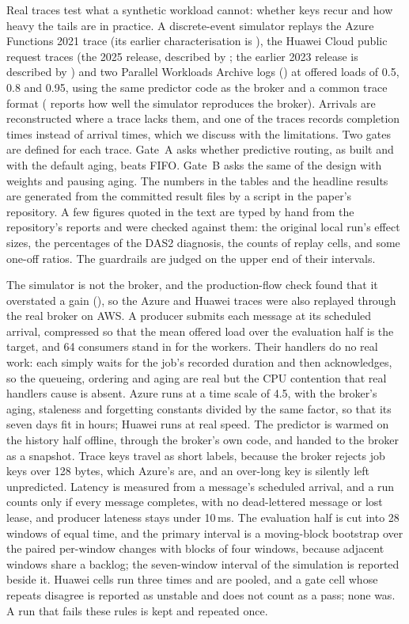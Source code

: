 Real traces test what a synthetic workload cannot: whether keys recur and how heavy the tails are in practice. A
discrete-event simulator replays the Azure Functions 2021 trace \citep{zhang2021harvest} (its earlier characterisation is \citet{shahrad2020}), the Huawei Cloud public request traces (the 2025 release, described by \citealt{joosen2025}; the earlier 2023 release is described by \citealt{joosen2023}) and two Parallel
Workloads Archive logs \citep{feitelson2014} () at offered loads of 0.5, 0.8 and 0.95, using the same predictor code as the broker and a common
trace format ( reports how well the simulator reproduces the broker). Arrivals are reconstructed where a trace lacks them, and one of the traces records completion times instead
of arrival times, which we discuss with the limitations. Two gates are defined for each trace. Gate~A asks whether
predictive routing, as built and with the default aging, beats FIFO. Gate~B asks the same of the design with weights
and pausing aging. The numbers in the tables and the headline results are generated from the committed result files by a script in
the paper's repository. A few figures quoted in the text are typed by hand from the repository's reports and were checked against them: the original local run's effect sizes, the percentages of the DAS2 diagnosis, the counts of replay cells, and some one-off ratios. The guardrails are judged on the upper end of their intervals.

The simulator is not the broker, and the production-flow check found that it overstated a gain (), so the Azure and Huawei traces were also replayed through the real broker on AWS. A producer submits each message at its scheduled arrival, compressed so that the mean offered load over the evaluation half is the target, and 64 consumers stand in for the workers. Their handlers do no real work: each simply waits for the job's recorded duration and then acknowledges, so the queueing, ordering and aging are real but the CPU contention that real handlers cause is absent. Azure runs at a time scale of 4.5, with the broker's aging, staleness and forgetting constants divided by the same factor, so that its seven days fit in hours; Huawei runs at real speed. The predictor is warmed on the history half offline, through the broker's own code, and handed to the broker as a snapshot. Trace keys travel as short labels, because the broker rejects job keys over 128 bytes, which Azure's are, and an over-long key is silently left unpredicted. Latency is measured from a message's scheduled arrival, and a run counts only if every message completes, with no dead-lettered message or lost lease, and producer lateness stays under 10\,ms. The evaluation half is cut into 28 windows of equal time, and the primary interval is a moving-block bootstrap over the paired per-window changes with blocks of four windows, because adjacent windows share a backlog; the seven-window interval of the simulation is reported beside it. Huawei cells run three times and are pooled, and a gate cell whose repeats disagree is reported as unstable and does not count as a pass; none was. A run that fails these rules is kept and repeated once.

